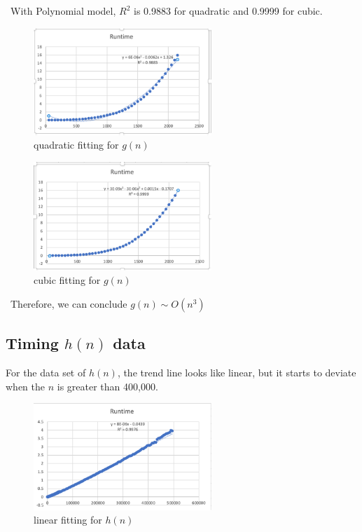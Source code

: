 \documentclass[12pt]{article}
\begin{document}
~\newline\noindent With Polynomial model, $R^2$ is 0.9883 for quadratic and 0.9999 for cubic. 
\begin{figure}[h!]
\centering
\includegraphics[width=0.6\textwidth,height=\textheight,keepaspectratio]{gn_2.png}
\caption{quadratic fitting for $g(n)$}
\label{Figure: gn_2}
\end{figure}

\begin{figure}[h!]
\centering
\includegraphics[width=0.6\textwidth,height=\textheight,keepaspectratio]{gn_3.png}
\caption{cubic fitting for $g(n)$}
\label{Figure: gn_3}
\end{figure}

\newpage ~\newline\noindent Therefore, we can conclude $g(n) \sim O(n^3)$

\subsection{Timing \(h(n)\) data}
For the data set of $h(n)$, the trend line looks like linear, but it starts to deviate when the $n$ is greater than 400,000. 

\begin{figure}[h!]
\centering
\includegraphics[width=0.6\textwidth,height=\textheight,keepaspectratio]{hn_1.png}
\caption{linear fitting for \(h(n)\)}
\label{Figure: hn_1}
\end{figure}
\end{document}

